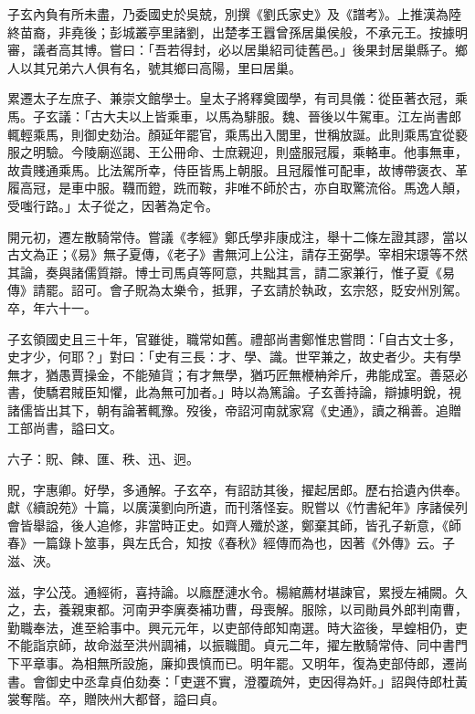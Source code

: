 \begin{pinyinscope}
 子玄內負有所未盡，乃委國史於吳兢，別撰《劉氏家史》及《譜考》。上推漢為陸終苗裔，非堯後；彭城叢亭里諸劉，出楚孝王囂曾孫居巢侯般，不承元王。按據明審，議者高其博。嘗曰：「吾若得封，必以居巢紹司徒舊邑。」後果封居巢縣子。鄉人以其兄弟六人俱有名，號其鄉曰高陽，里曰居巢。



 累遷太子左庶子、兼崇文館學士。皇太子將釋奠國學，有司具儀：從臣著衣冠，乘馬。子玄議：「古大夫以上皆乘車，以馬為騑服。魏、晉後以牛駕車。江左尚書郎輒輕乘馬，則御史劾治。顏延年罷官，乘馬出入閭里，世稱放誕。此則乘馬宜從褻服之明驗。今陵廟巡謁、王公冊命、士庶親迎，則盛服冠履，乘輅車。他事無車，故貴賤通乘馬。比法駕所幸，侍臣皆馬上朝服。且冠履惟可配車，故博帶褒衣、革履高冠，是車中服。韈而鐙，跣而鞍，非唯不師於古，亦自取驚流俗。馬逸人顛，受嗤行路。」太子從之，因著為定令。



 開元初，遷左散騎常侍。嘗議《孝經》鄭氏學非康成注，舉十二條左證其謬，當以古文為正；《易》無子夏傳，《老子》書無河上公注，請存王弼學。宰相宋璟等不然其論，奏與諸儒質辯。博士司馬貞等阿意，共黜其言，請二家兼行，惟子夏《易傳》請罷。詔可。會子貺為太樂令，抵罪，子玄請於執政，玄宗怒，貶安州別駕。卒，年六十一。



 子玄領國史且三十年，官雖徙，職常如舊。禮部尚書鄭惟忠嘗問：「自古文士多，史才少，何耶？」對曰：「史有三長：才、學、識。世罕兼之，故史者少。夫有學無才，猶愚賈操金，不能殖貨；有才無學，猶巧匠無楩柟斧斤，弗能成室。善惡必書，使驕君賊臣知懼，此為無可加者。」時以為篤論。子玄善持論，辯據明銳，視諸儒皆出其下，朝有論著輒豫。歿後，帝詔河南就家寫《史通》，讀之稱善。追贈工部尚書，謚曰文。



 六子：貺、餗、匯、秩、迅、迥。



 貺，字惠卿。好學，多通解。子玄卒，有詔訪其後，擢起居郎。歷右拾遺內供奉。獻《續說苑》十篇，以廣漢劉向所遺，而刊落怪妄。貺嘗以《竹書紀年》序諸侯列會皆舉謚，後人追修，非當時正史。如齊人殲於遂，鄭棄其師，皆孔子新意，《師春》一篇錄卜筮事，與左氏合，知按《春秋》經傳而為也，因著《外傳》云。子滋、浹。



 滋，字公茂。通經術，喜持論。以廕歷漣水令。楊綰薦材堪諫官，累授左補闕。久之，去，養親東都。河南尹李廙奏補功曹，母喪解。服除，以司勛員外郎判南曹，勤職奉法，進至給事中。興元元年，以吏部侍郎知南選。時大盜後，旱蝗相仍，吏不能詣京師，故命滋至洪州調補，以振職聞。貞元二年，擢左散騎常侍、同中書門下平章事。為相無所設施，廉抑畏慎而已。明年罷。又明年，復為吏部侍郎，遷尚書。會御史中丞韋貞伯劾奏：「吏選不實，澄覆疏舛，吏因得為奸。」詔與侍郎杜黃裳奪階。卒，贈陜州大都督，謚曰貞。




\end{pinyinscope}
